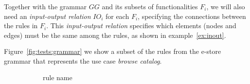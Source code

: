 Together with the grammar $GG$ and its subsets of functionalities $F_i$, we will also need an \emph{input-output relation} $IO_i$ for each $F_i$, specifying the connections between the rules in $F_i$. This \emph{input-output relation} specifies which elements (nodes and edges) must be the same among the rules, as shown in example~\ref{ex:inout}.

\begin{example} Figure~\ref{fig:tests:grammar} we show a subset of the rules from the e-store grammar that represents the use case \emph{browse catalog}. 

\begin{figure}[!ht]
  \centering
  \begin{subfigure}[t]{.5\textwidth}
    \centerline{}
    \caption{rule name}
  \end{subfigure}%
  \begin{subfigure}[t]{.5\textwidth}
    \centerline{}

\end{subfigure}
\end{figure}
\end{example}
